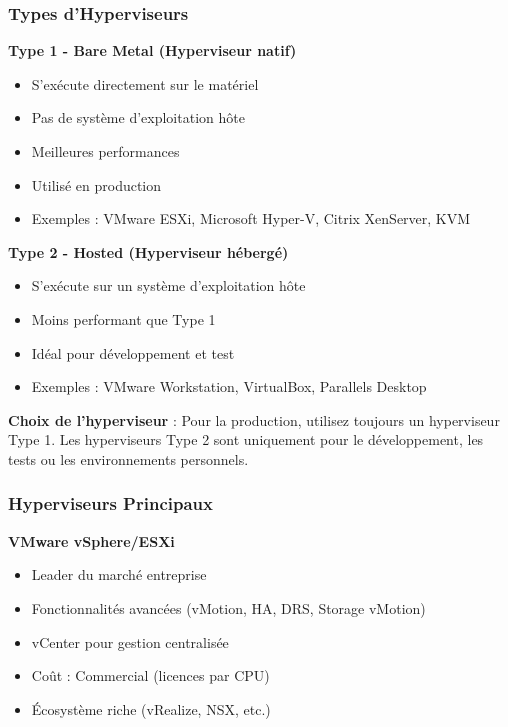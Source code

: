 \documentclass[11pt,a4paper]{article}
\begin{document}
\subsubsection{Types d'Hyperviseurs}

\textbf{Type 1 - Bare Metal (Hyperviseur natif)}
\begin{itemize}
    \item S'exécute directement sur le matériel
    \item Pas de système d'exploitation hôte
    \item Meilleures performances
    \item Utilisé en production
    \item Exemples : VMware ESXi, Microsoft Hyper-V, Citrix XenServer, KVM
\end{itemize}

\textbf{Type 2 - Hosted (Hyperviseur hébergé)}
\begin{itemize}
    \item S'exécute sur un système d'exploitation hôte
    \item Moins performant que Type 1
    \item Idéal pour développement et test
    \item Exemples : VMware Workstation, VirtualBox, Parallels Desktop
\end{itemize}

\begin{importantbox}
\textbf{Choix de l'hyperviseur} : Pour la production, utilisez toujours un hyperviseur Type 1. Les hyperviseurs Type 2 sont uniquement pour le développement, les tests ou les environnements personnels.
\end{importantbox}

\subsubsection{Hyperviseurs Principaux}

\textbf{VMware vSphere/ESXi}
\begin{itemize}
    \item Leader du marché entreprise
    \item Fonctionnalités avancées (vMotion, HA, DRS, Storage vMotion)
    \item vCenter pour gestion centralisée
    \item Coût : Commercial (licences par CPU)
    \item Écosystème riche (vRealize, NSX, etc.)
\end{itemize}
\end{document}
